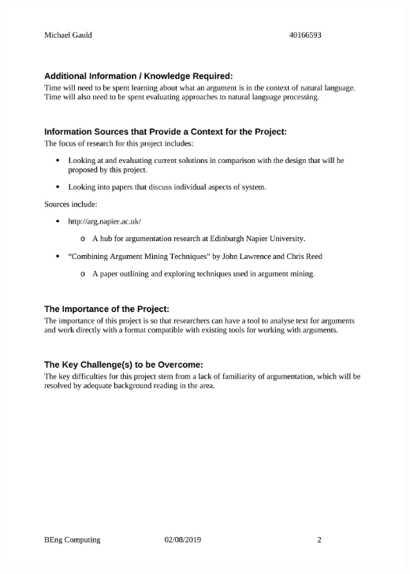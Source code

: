 \documentclass[12pt,a4paper]{article}
\begin{document}
\begin{appendices}
\includegraphics[scale=0.25]{Report/graphics/IPO-2.png}

\newpage

\end{appendices}
\end{document}
